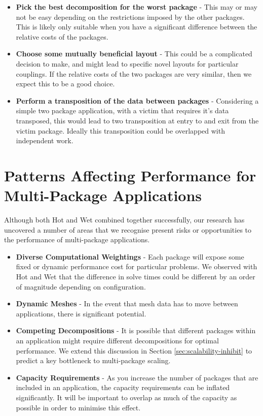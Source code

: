 \documentclass[runningheads,a4paper]{llncs}
\begin{document}
\begin{itemize}
  \item \textbf{Pick the best decomposition for the worst package} - This may or may not be easy depending on the restrictions imposed by the other packages. This is likely only suitable when you have a significant difference between the relative costs of the packages.
  \item \textbf{Choose some mutually beneficial layout} - This could be a complicated decision to make, and might lead to specific novel layouts for particular couplings. If the relative costs of the two packages are very similar, then we expect this to be a good choice.
  \item \textbf{Perform a transposition of the data between packages} - Considering a simple two package application, with a victim that requires it's data transposed, this would lead to two transposition at entry to and exit from the victim package. Ideally this transposition could be overlapped with independent work.
\end{itemize}

\section{Patterns Affecting Performance for Multi-Package Applications}

Although both Hot and Wet combined together successfully, our research has uncovered a number of areas that we recognise present risks or opportunities to the performance of multi-package applications. 

\begin{itemize}
  \item \textbf{Diverse Computational Weightings} - Each package will expose some fixed or dynamic performance cost for particular problems. We observed with Hot and Wet that the difference in solve times could be different by an order of magnitude depending on configuration.
  \item \textbf{Dynamic Meshes} - In the event that mesh data has to move between applications, there is significant potential.
  \item \textbf{Competing Decompositions} - It is possible that different packages within an application might require different decompositions for optimal performance. We extend this discussion in Section \ref{sec:scalability-inhibit} to predict a key bottleneck to multi-package scaling.
  \item \textbf{Capacity Requirements} - As you increase the number of packages that are included in an application, the capacity requirements can be inflated significantly. It will be important to overlap as much of the capacity as possible in order to minimise this effect.
\end{itemize}
\end{document}
